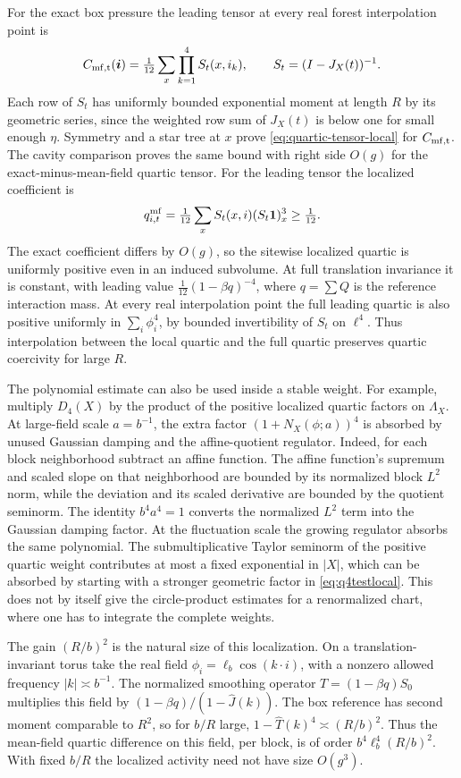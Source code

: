 \documentclass[11pt]{article}
\begin{document}
For the exact box pressure the leading tensor at every real
forest interpolation point is
\[
 C_{\rm mf,t}(\boldsymbol i)=\tfrac1{12}\sum_x
                         \prod_{k=1}^4 S_t(x,i_k),
 \qquad S_t=(I-J_X(t))^{-1}.
\]
Each row of \(S_t\) has uniformly bounded exponential moment
at length \(R\) by its geometric series, since the weighted row
sum of \(J_X(t)\) is below one for small enough \(\eta\). Symmetry
and a star tree at \(x\) prove \eqref{eq:quartic-tensor-local} for
\(C_{\rm mf,t}\). The cavity comparison proves the same bound with
right side \(O(g)\) for the exact-minus-mean-field quartic tensor.
For the leading tensor the localized coefficient is
\[
 q_{i,t}^{\rm mf}=\tfrac1{12}\sum_x S_t(x,i)(S_t\mathbf 1)_x^3
 \ge \tfrac1{12}.
\]
The exact coefficient differs by \(O(g)\), so the sitewise localized
quartic is uniformly positive even in an induced subvolume.
At full translation invariance it is constant, with leading value
\(\tfrac1{12}(1-\beta q)^{-4}\), where \(q=\sum Q\) is the
reference interaction mass. At every real interpolation point
the full leading quartic is also positive uniformly in \(\sum_i\phi_i^4\),
by bounded invertibility of \(S_t\) on \(\ell^4\). Thus interpolation
between the local quartic and the full quartic preserves quartic
coercivity for large \(R\).

The polynomial estimate can also be used inside a stable weight.
For example, multiply \(D_4(X)\) by the product of the positive
localized quartic factors on \(\Lambda_X\). At large-field scale
\(a=b^{-1}\), the extra factor \((1+N_X(\phi;a))^4\) is absorbed
by unused Gaussian damping and the affine-quotient regulator.
Indeed, for each block neighborhood subtract an affine function.
The affine function's supremum and scaled slope on that
neighborhood are bounded by its normalized block \(L^2\) norm,
while the deviation and its scaled derivative are bounded by
the quotient seminorm. The identity \(b^4a^4=1\) converts
the normalized \(L^2\) term into the Gaussian damping factor.
At the fluctuation scale the growing regulator absorbs the same
polynomial. The submultiplicative Taylor seminorm of the positive
quartic weight contributes at most a fixed exponential in
\(|X|\), which can be absorbed by starting with a stronger
geometric factor in \eqref{eq:q4testlocal}. This does not by
itself give the circle-product estimates for a renormalized
chart, where one has to integrate the complete weights.

The gain \((R/b)^2\) is the natural size of this localization.
On a translation-invariant torus take the real field
\(\phi_i=\ell_b\cos(k\cdot i)\), with a nonzero allowed frequency
\(|k|\asymp b^{-1}\). The normalized smoothing operator
\(T=(1-\beta q)S_0\) multiplies this field by
\((1-\beta q)/(1-\widehat J(k))\). The box reference has
second moment comparable to \(R^2\), so for \(b/R\) large,
\(1-\widehat T(k)^4\asymp (R/b)^2\). Thus the mean-field
quartic difference on this field, per block, is of order
\(b^4\ell_b^4(R/b)^2\). With fixed \(b/R\) the
localized activity need not have size \(O(g^3)\).
\end{document}

